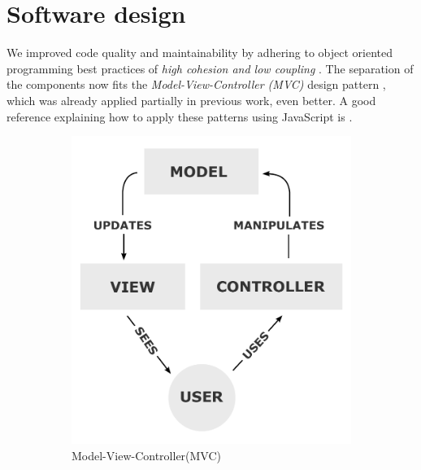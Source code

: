 \section{Software design}\label{sec:design}%
We improved code quality and maintainability by adhering to object oriented programming best practices of \textit{high cohesion and low coupling} . The separation of the components now fits the \textit{Model-View-Controller (MVC)} design pattern , which was already applied partially in previous work, even better. A good reference explaining how to apply these patterns using JavaScript is \cite{stefanov2010javascript}.
\begin{figure}
\centering
\begin{subfigure}[b]{0.3\textwidth}
\includegraphics[width=\textwidth]{fig/MVC-Process}
	\caption{Model-View-Controller(MVC)\footnotemark}
	\label{fig:mvc}
\end{subfigure}
\begin{subfigure}[b]{0.68\textwidth}
\begin{small}
\begin{ssfont}
\begin{itemize}

\end{itemize}
\end{ssfont}
\end{small}
\end{subfigure}
\end{figure}
